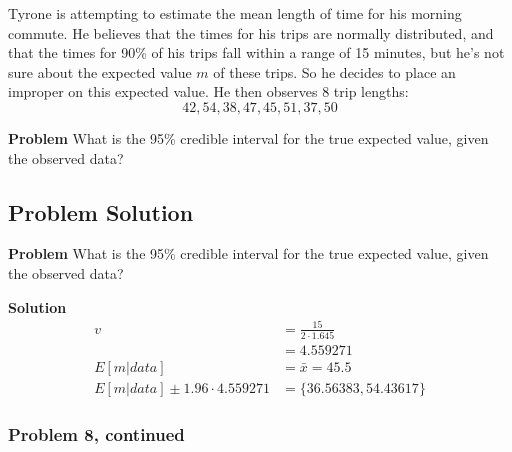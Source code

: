 \documentclass[12pt]{article}
\theoremstyle{definition}
\begin{document}
Tyrone is attempting to estimate the mean length of time for his morning commute. He believes that the times for his trips are normally distributed, and that the times for 90\% of his trips fall within a range of 15 minutes, but he's not sure about the expected value $m$ of these trips. So he decides to place an improper on this expected value. He then observes 8 trip lengths:
$$
42, 54, 38, 47, 45, 51, 37, 50
$$

\noindent
{\bf Problem} What is the 95\% credible interval for the true expected value, given the observed data?


\subsection*{Problem Solution}

\noindent
{\bf Problem} What is the 95\% credible interval for the true expected value, given the observed data?

\bigskip
\noindent
{\bf Solution} 
\begin{align*}
v &= \frac{15}{2 \cdot 1.645}\\
&= 4.559271\\
E[m|data] &= \bar{x} = 45.5\\
E[m|data] \pm 1.96 \cdot 4.559271 &= \{36.56383, 54.43617\}
\end{align*}

\newpage
\subsubsection*{Problem 8, continued}
\end{document}
